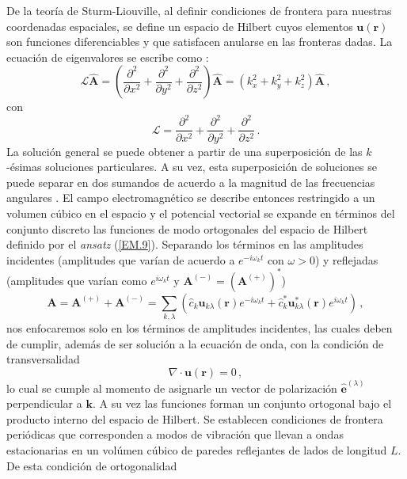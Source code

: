 De la teoría de Sturm-Liouville, al definir condiciones de frontera para nuestras coordenadas espaciales, se define un espacio de Hilbert cuyos elementos $\mathbf{u}(\mathbf{r})$ son funciones diferenciables y que satisfacen anularse en las fronteras dadas. La ecuación de eigenvalores se escribe como \cite{Arfken}:
\begin{equation}
  \label{EM.10}
  \mathcal{L} \hat{\mathbf{A}} = \left( \frac{\partial^2}{\partial x^2} + \frac{\partial^2}{\partial y^2} + \frac{\partial^2}{\partial z^2} \right) \hat{\mathbf{A}} = (k_x^2 + k_y^2 + k_z^2) \hat{\mathbf{A}} \,,
\end{equation}
con
\begin{equation}
  \label{EM.11}
  \mathcal{L} = \frac{\partial^2}{\partial x^2} + \frac{\partial^2}{\partial y^2} + \frac{\partial^2}{\partial z^2} \,.
\end{equation}
La solución general se puede obtener a partir de una superposición de las $k$-ésimas soluciones particulares. A su vez, esta superposición de soluciones se puede separar en dos sumandos de acuerdo a la magnitud de las frecuencias angulares \cite{Riley}. El campo electromagnético se describe entonces restringido a un volumen cúbico en el espacio y el potencial vectorial se expande en términos del conjunto discreto las funciones de modo ortogonales del espacio de Hilbert definido por el \textit{ansatz} (\ref{EM.9}). Separando los términos en las amplitudes incidentes (amplitudes que varían de acuerdo a $e^{-i\omega_k t}$ con $\omega>0$) y reflejadas (amplitudes que varían como $e^{i\omega_k t }$ y $\mathbf{A}^{(-)} = (\mathbf{A}^{(+)})^*$) %
\begin{equation}
  \label{EM.12}
  \mathbf{A} = \mathbf{A}^{(+)} + \mathbf{A}^{(-)} = \sum_{k,\lambda} \left( \hat{c}_{k} \mathbf{u}_{k\lambda} (\mathbf{r})e^{-i\omega_k t} +  \hat{c}_{k}^* \mathbf{u}_{k\lambda}^* (\mathbf{r})e^{i\omega_{k} t} \right) \,,
\end{equation}
nos enfocaremos solo en los términos de amplitudes incidentes, las cuales deben de cumplir, además de ser solución a la ecuación de onda, con la condición de transversalidad
\begin{equation}
  \label{EM.13}
  \nabla \cdot \mathbf{u}(\mathbf{r}) = 0 \,,
\end{equation}
lo cual se cumple al momento de asignarle un vector de polarización $\mathbf{\hat{e}}^{(\lambda)}$ perpendicular a $\mathbf{k}$. A su vez las funciones forman un conjunto ortogonal bajo el producto interno del espacio de Hilbert. Se establecen condiciones de frontera periódicas que corresponden a modos de vibración que llevan a ondas estacionarias en un volúmen cúbico de paredes reflejantes de lados de longitud $L$. De esta condición de ortogonalidad
